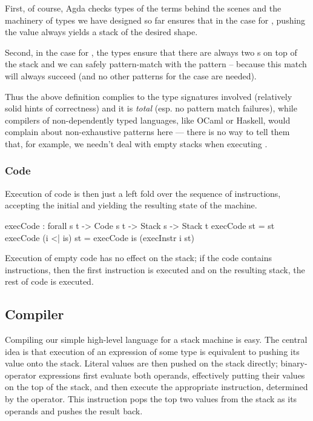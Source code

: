 First, of course, Agda checks types of the terms behind
the scenes and the machinery of types we have designed so far ensures that
in the case for , pushing the value  always yields
a stack of the desired shape.

Second, in the case for , the types ensure that there are always two
s on top of the stack and we can safely pattern-match with the
pattern  \scons {} \scons {} -- because this match
will always succeed (and no other patterns for the  case are needed). 

Thus the above definition complies to the type signatures involved (relatively
solid hints of correctness) and it is \emph{total} (esp. no pattern match failures),
while compilers of non-dependently typed languages, like OCaml or Haskell,
would complain about non-exhaustive patterns here --- there is no way to tell them
that, for example, we needn't deal with empty stacks when executing .

\subsubsection{Code}

Execution of code is then just a left fold over the sequence of instructions,
accepting the initial and yielding the resulting state of the machine.

\begin{code}
  execCode : forall {s t} -> Code s t -> Stack s -> Stack t
  execCode \nil st = st
  execCode (i <| is) st = execCode is (execInstr i st)
\end{code}

\noindent Execution of empty code has no effect on the stack; if the code
contains instructions, then the first instruction is executed and on the
resulting stack, the rest of code is executed.

\subsection{Compiler}

Compiling our simple high-level language for a stack machine is easy. The
central idea is that execution of an expression of some type is equivalent to
pushing its value onto the stack. Literal values are then pushed on the stack
directly; binary-operator expressions first evaluate both operands, effectively
putting their values on the top of the stack, and then execute the appropriate
instruction, determined by the operator. This instruction pops the top
two values from the stack as its operands and pushes the result back.

